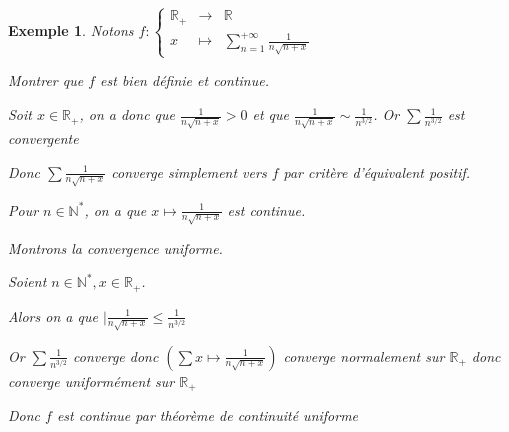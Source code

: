 \documentclass[a4paper,12pt]{book}
\newtheorem{Exe}{Exemple}[section]
\def\R{\mathbb{R}}
\def\N{\mathbb{N}}
\begin{document}
\begin{Exe}
Notons $f:\left\{\begin{array}{rcl} \R_+ & \to & \R \\ x & \mapsto & \sum\limits_{n=1}^{+\infty}\frac{1}{n\sqrt{n+x}}\end{array}\right.$ \par Montrer que $f$ est bien définie et continue. \par Soit $x\in\R_+$, on a donc que $\frac{1}{n\sqrt{n+x}}>0$ et que $\frac{1}{n\sqrt{n+x}}\sim\frac{1}{n^{3/2}}$. Or $\sum \frac{1}{n^{3/2}}$ est convergente \par Donc $\sum\frac{1}{n\sqrt{n+x}}$ converge simplement vers $f$ par critère d'équivalent positif. \par Pour $n\in\N^*$, on a que $x\mapsto \frac{1}{n\sqrt{n+x}}$ est continue.\par Montrons la convergence uniforme.
\par Soient $n\in\N^*, x\in\R_+$. \par Alors on a que $\vert \frac{1}{n\sqrt{n+x}}\leq\frac{1}{n^{3/2}}$ \par Or $\sum\frac{1}{n^{3/2}}$ converge donc $\left(\sum x\mapsto\frac{1}{n\sqrt{n+x}}\right)$ converge normalement sur $\R_+$ donc converge uniformément sur $\R_+$ \par Donc $f$ est continue par théorème de continuité uniforme
\end{Exe}
\end{document}
